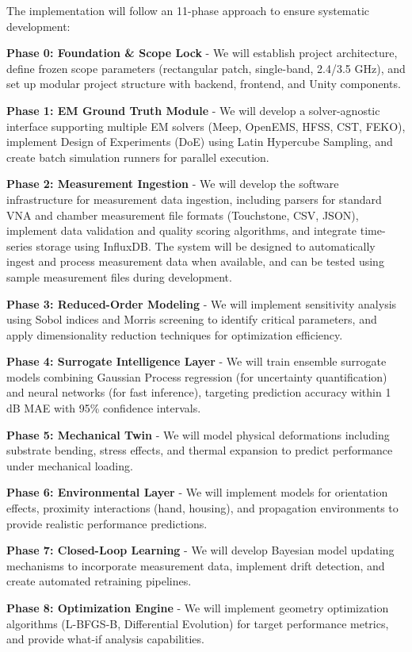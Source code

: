 \documentclass[11pt]{article}
\begin{document}
The implementation will follow an 11-phase approach to ensure systematic development:

\textbf{Phase 0: Foundation \& Scope Lock} - We will establish project architecture, define frozen scope parameters (rectangular patch, single-band, 2.4/3.5 GHz), and set up modular project structure with backend, frontend, and Unity components.

\textbf{Phase 1: EM Ground Truth Module} - We will develop a solver-agnostic interface supporting multiple EM solvers (Meep, OpenEMS, HFSS, CST, FEKO), implement Design of Experiments (DoE) using Latin Hypercube Sampling, and create batch simulation runners for parallel execution.

\textbf{Phase 2: Measurement Ingestion} - We will develop the software infrastructure for measurement data ingestion, including parsers for standard VNA and chamber measurement file formats (Touchstone, CSV, JSON), implement data validation and quality scoring algorithms, and integrate time-series storage using InfluxDB. The system will be designed to automatically ingest and process measurement data when available, and can be tested using sample measurement files during development.

\textbf{Phase 3: Reduced-Order Modeling} - We will implement sensitivity analysis using Sobol indices and Morris screening to identify critical parameters, and apply dimensionality reduction techniques for optimization efficiency.

\textbf{Phase 4: Surrogate Intelligence Layer} - We will train ensemble surrogate models combining Gaussian Process regression (for uncertainty quantification) and neural networks (for fast inference), targeting prediction accuracy within 1 dB MAE with 95\% confidence intervals.

\textbf{Phase 5: Mechanical Twin} - We will model physical deformations including substrate bending, stress effects, and thermal expansion to predict performance under mechanical loading.

\textbf{Phase 6: Environmental Layer} - We will implement models for orientation effects, proximity interactions (hand, housing), and propagation environments to provide realistic performance predictions.

\textbf{Phase 7: Closed-Loop Learning} - We will develop Bayesian model updating mechanisms to incorporate measurement data, implement drift detection, and create automated retraining pipelines.

\textbf{Phase 8: Optimization Engine} - We will implement geometry optimization algorithms (L-BFGS-B, Differential Evolution) for target performance metrics, and provide what-if analysis capabilities.
\end{document}
